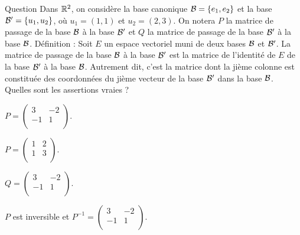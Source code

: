 \begin{multi}[multiple,feedback=
{Une matrice de passage est inversible, puisque l'application linéaire associée est bijective. L'inverse de la matrice de passage de la base \({\cal {B}}\) à la base \({\cal {B}}'\) est la matrice de passage de la base \({\cal {B}}'\) à la base \({\cal {B}}\) :
\[P = \left(\begin{array}{rc}1&2\\
1&3\\ \end{array}\right)\quad \mbox{et}\quad Q = P^{-1}= \left(\begin{array}{rc}
3&-2\\-1&1\\ \end{array}\right).\]
}]{Question}
Dans \(\mathbb{R}^2\), on considère la base canonique \({\cal {B}} =\{e_1,e_2\}\) et  la base \({\cal {B}}' =\{u_1,u_2\}\), où 
\(u_1=(1,1)\) et \(u_2=(2,3)\). On notera \(P\) la matrice de passage de la base \({\cal {B}}\) à la base \({\cal {B}}'\) et \(Q\) la matrice de passage de la base \({\cal {B}}'\) à la base \({\cal {B}}\).
\vskip0mm
Définition : Soit \(E\) un espace vectoriel muni de deux bases \({\cal {B}}\) et \({\cal {B}}'\).
La matrice de passage de la base \({\cal {B}}\) à la base  \({\cal {B}}'\) est la matrice de l'identité de \(E\) de la base 
\({\cal {B}}'\) à la base  \({\cal {B}}\). Autrement dit, c'est la matrice dont la jième colonne est constituée des coordonnées du jième vecteur de la base \({\cal {B}'}\) dans la base  \({\cal {B}}\).
\vskip2mm
Quelles sont les assertions vraies ?

    \item \(P = \left(\begin{array}{rc}
3&-2\\
-1&1\\
\end{array}\right).\)
    \item* \(P = \left(\begin{array}{rc}
1&2\\
1&3\\
\end{array}\right).\)
    \item* \(Q = \left(\begin{array}{rc}
3&-2\\
-1&1\\
\end{array}\right).\)
    \item* \(P\) est inversible et \(P^{-1}=\left(\begin{array}{rc}
3&-2\\
-1&1\\
\end{array}\right).\)
\end{multi}


